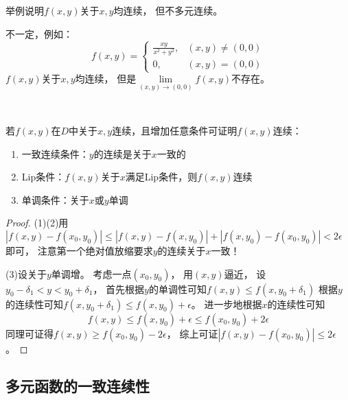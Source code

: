 \begin{example}[关于$x,y$连续，不多元连续]
  举例说明$f(x,y)$关于$x,y$均连续，
  但不多元连续。
\end{example}

\begin{solution}
  不一定，例如：
  \begin{equation*}
    f(x,y) =
    \begin{cases}
      \frac{xy}{x^2 + y^2}, & (x,y) \neq (0,0)\\
      0, & (x,y) = (0,0)
    \end{cases}
  \end{equation*}
  $f(x,y)$关于$x,y$均连续，
  但是$\lim \limits _{(x,y) \rightarrow (0,0)}f(x,y)$不存在。
\end{solution}

~

\begin{exercise}[加强条件]
  若$f(x,y)$在$D$中关于$x,y$连续，且增加任意条件可证明$f(x,y)$连续：
  \begin{enumerate}
  \item 一致连续条件：$y$的连续是关于$x$一致的
  \item Lip条件：$f(x,y)$关于$x$满足Lip条件，则$f(x,y)$连续
  \item 单调条件：关于$x$或$y$单调
  \end{enumerate}
\end{exercise}

\begin{proof}
  (1)(2)用$|f(x,y) - f(x_0,y_0)| \leq |f(x,y) - f(x,y_0)| + |f(x,y_0) - f(x_0,y_0)| < 2\epsilon$即可，
  注意第一个绝对值放缩要求$y$的连续关于$x$一致！

  (3)设关于$y$单调增。
  考虑一点$(x_0,y_0)$，
  用$(x,y)$逼近，
  设$y_0 - \delta_1 < y < y_0 + \delta_1$，
  首先根据$y$的单调性可知$f(x,y) \leq f(x,y_0 + \delta_1)$
  根据$y$的连续性可知$f(x,y_0 + \delta_1) \leq f(x, y_0) + \epsilon$。
  进一步地根据$x$的连续性可知
  \begin{equation*}
    f(x,y) \leq f(x,y_0) + \epsilon \leq  f(x_0,y_0) + 2\epsilon
  \end{equation*}
  同理可证得$f(x,y) \geq f(x_0,y_0) - 2\epsilon$，
  综上可证$|f(x,y) - f(x_0,y_0)| \leq 2\epsilon$。
\end{proof}


\subsection{多元函数的一致连续性}

